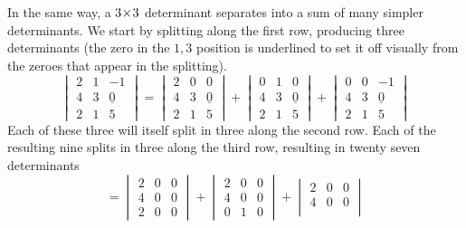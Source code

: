 \begin{example}
In the same way,
a \( 3 \! \times \! 3 \) determinant separates into a sum of 
many simpler determinants.
We start by splitting along the first row, producing three determinants
(the zero in the $1,3$ position is underlined to set it off visually
from the zeroes that appear in the splitting).
\begin{equation*}
  \begin{vmatrix}
     2              &1  &-1  \\
     4              &3  &\underline{0}  \\
     2              &1  &5
  \end{vmatrix}
  =
  \begin{vmatrix}
     2              &0  &0   \\
     4              &3  &\underline{0}  \\
     2              &1  &5
  \end{vmatrix}
  +
  \begin{vmatrix}
     0              &1  &0   \\
     4              &3  &\underline{0}   \\
     2              &1  &5
  \end{vmatrix}
  +
  \begin{vmatrix}
     0              &0  &-1  \\
     4              &3  &\underline{0}  \\
     2  &1  &5
  \end{vmatrix}                       
\end{equation*}
Each of these three will itself split in three along the second row.
Each of the resulting nine splits in three along the third row, resulting
in twenty seven determinants
\begin{equation*}
  =
  \begin{vmatrix}
     2              &0  &0   \\
     4              &0  &0   \\
     2              &0  &0
  \end{vmatrix}
  +
  \begin{vmatrix}
     2  &0  &0   \\
     4  &0  &0   \\
     0  &1  &0
  \end{vmatrix}
  +
  \begin{vmatrix}
     2  &0  &0   \\
     4  &0  &0   \\

\end{vmatrix}
\end{equation*}
\end{example}
